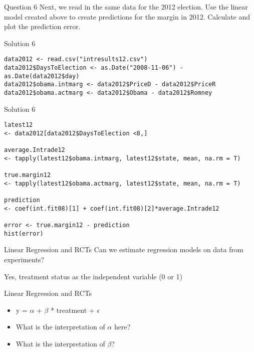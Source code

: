 \documentclass[presentation]{beamer}
\begin{document}
\begin{frame}[label={sec:org370c0b7}]{Question 6}
Next, we read in the same data for the 2012 election. Use the linear model created above to create predictions for the margin in 2012. Calculate and plot the prediction error.
\end{frame}

\begin{frame}[fragile,shrink=25,label={sec:orgc5aad3b}]{Solution 6}
 \begin{verbatim}
data2012 <- read.csv("intresults12.csv")
data2012$DaysToElection <- as.Date("2008-11-06") - as.Date(data2012$day)
data2012$obama.intmarg <- data2012$PriceD - data2012$PriceR
data2012$obama.actmarg <- data2012$Obama - data2012$Romney
\end{verbatim}
\end{frame}


\begin{frame}[fragile,shrink=25,label={sec:orgec81d46}]{Solution 6}
 \begin{verbatim}
latest12
<- data2012[data2012$DaysToElection <8,]

average.Intrade12
<- tapply(latest12$obama.intmarg, latest12$state, mean, na.rm = T)

true.margin12
<- tapply(latest12$obama.actmarg, latest12$state, mean, na.rm = T)

prediction
<- coef(int.fit08)[1] + coef(int.fit08)[2]*average.Intrade12

error <- true.margin12 - prediction
hist(error)
\end{verbatim}
\end{frame}


\begin{frame}[label={sec:org847ac32}]{Linear Regression and RCTs}
Can we estimate regression models on data from experiments?

\pause

\alert{Yes, treatment status as the independent variable (0 or 1)}
\end{frame}



\begin{frame}[label={sec:orgda3310f}]{Linear Regression and RCTs}
\begin{itemize}
\item y = \(\alpha\) + \(\beta\) * treatment + \(\epsilon\)
\end{itemize}


\begin{itemize}
\item What is the interpretation of \(\alpha\) here?
\end{itemize}

\pause

\begin{itemize}
\item What is the interpretation of \(\beta\)?
\end{itemize}
\end{frame}
\end{document}
